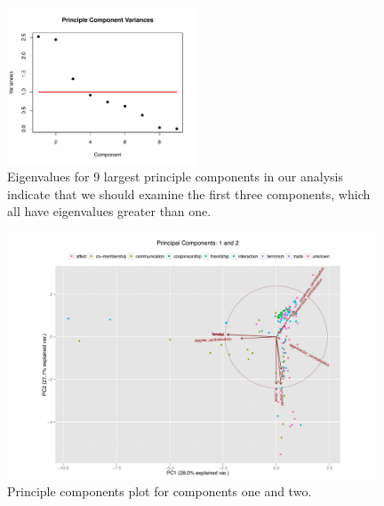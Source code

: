 \documentclass[3p,times]{elsarticle}
\begin{document}
\begin{figure}
\begin{center}
	\caption{\label{fig:PCA variacnes} Eigenvalues for 9 largest principle components in our analysis indicate that we should examine the first three components, which all have eigenvalues greater than one.}
		\includegraphics[width = 0.5\textwidth]{./images/Observed_PCA_Component_Varinces.pdf}
\end{center}
\end{figure}

\begin{figure}
\begin{center}
	\caption{\label{fig:1 and 2} Principle components plot for components one and two.}
		\includegraphics[width = 0.98\textwidth]{./images/Observed_PCA_Components1_2.pdf}
\end{center}
\end{figure}
\end{document}

